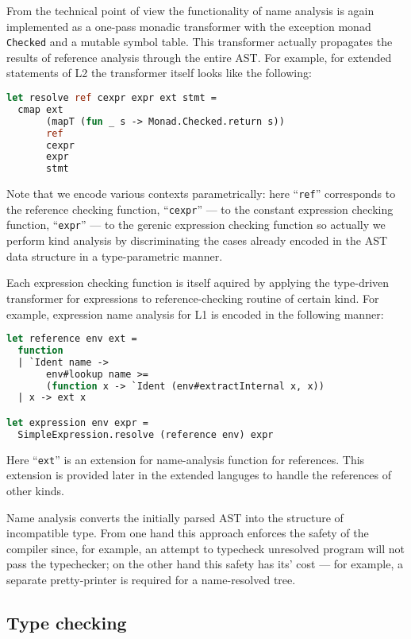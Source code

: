 From the technical point of view the functionality of name analysis is again implemented as a 
one-pass monadic transformer with the exception monad \lstinline{Checked} and a mutable symbol 
table. This transformer actually propagates the results of reference analysis through the 
entire AST. For example, for extended statements of L2 the transformer itself looks like
the following:

\begin{lstlisting}[language=ocaml]
let resolve ref cexpr expr ext stmt =
  cmap ext 
       (mapT (fun _ s -> Monad.Checked.return s)) 
       ref 
       cexpr 
       expr 
       stmt
\end{lstlisting}

Note that we encode various contexts parametrically: here ``\lstinline{ref}'' corresponds
to the reference checking function, ``\lstinline{cexpr}'' --- to the constant expression 
checking function, ``\lstinline{expr}'' --- to the gerenic expression checking function
so actually we perform kind analysis by discriminating the cases already encoded in
the AST data structure in a type-parametric manner. 

Each expression checking function is itself aquired by applying the type-driven transformer 
for expressions to reference-checking routine of certain kind. For example, expression 
name analysis for L1 is encoded in the following manner:

\begin{lstlisting}[language=ocaml]
let reference env ext = 
  function
  | `Ident name -> 
       env#lookup name >= 
       (function x -> `Ident (env#extractInternal x, x))
  | x -> ext x

let expression env expr = 
  SimpleExpression.resolve (reference env) expr 
\end{lstlisting}

Here ``\lstinline{ext}'' is an extension for name-analysis function for references. This 
extension is provided later in the extended languges to handle the references of other kinds.

Name analysis converts the initially parsed AST into the structure of incompatible 
type. From one hand this approach enforces the safety of the compiler since, for example, an attempt
to typecheck unresolved program will not pass the typechecker; on the other hand this
safety has its' cost --- for example, a separate pretty-printer is required for a
name-resolved tree. 

\subsection{Type checking}

